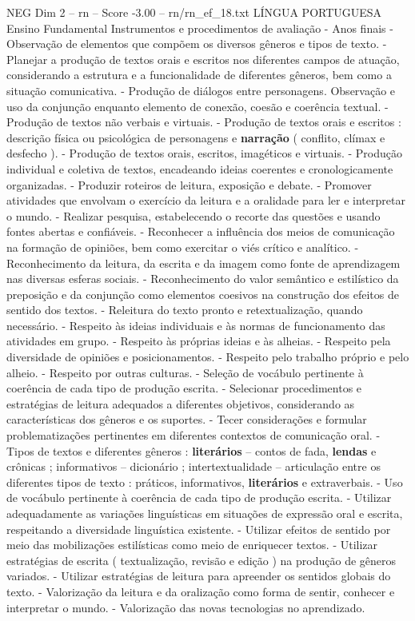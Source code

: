 \begin{textsample}{NEG Dim 2 – rn – Score -3.00 – rn/rn\_ef\_18.txt}  \label{ex:f2_neg_041}
LÍNGUA PORTUGUESA Ensino Fundamental Instrumentos e procedimentos de avaliação - Anos finais - Observação de elementos que compõem os diversos gêneros e tipos de texto. - Planejar a produção de textos orais e escritos nos diferentes campos de atuação, considerando a estrutura e a funcionalidade de diferentes gêneros, bem como a situação comunicativa. - Produção de diálogos entre personagens.
Observação e uso da conjunção enquanto elemento de conexão, coesão e coerência textual. - Produção de textos não verbais e virtuais. - Produção de textos orais e escritos : descrição física ou psicológica de personagens e \textbf{narração} ( conflito, clímax e desfecho ). - Produção de textos orais, escritos, imagéticos e virtuais. - Produção individual e coletiva de textos, encadeando ideias coerentes e cronologicamente organizadas. - Produzir roteiros de leitura, exposição e debate. - Promover atividades que envolvam o exercício da leitura e a oralidade para ler e interpretar o mundo. - Realizar pesquisa, estabelecendo o recorte das questões e usando fontes abertas e confiáveis. - Reconhecer a influência dos meios de comunicação na formação de opiniões, bem como exercitar o viés crítico e analítico. - Reconhecimento da leitura, da escrita e da imagem como fonte de aprendizagem nas diversas esferas sociais. - Reconhecimento do valor semântico e estilístico da preposição e da conjunção como elementos coesivos na construção dos efeitos de sentido dos textos. - Releitura do texto pronto e retextualização, quando necessário. - Respeito às ideias individuais e às normas de funcionamento das atividades em grupo. - Respeito às próprias ideias e às alheias. - Respeito pela diversidade de opiniões e posicionamentos. - Respeito pelo trabalho próprio e pelo alheio. - Respeito por outras culturas. - Seleção de vocábulo pertinente à coerência de cada tipo de produção escrita. - Selecionar procedimentos e estratégias de leitura adequados a diferentes objetivos, considerando as características dos gêneros e os suportes. - Tecer considerações e formular problematizações pertinentes em diferentes contextos de comunicação oral. - Tipos de textos e diferentes gêneros : \textbf{literários} – contos de fada, \textbf{lendas} e crônicas ; informativos – dicionário ; intertextualidade – articulação entre os diferentes tipos de texto : práticos, informativos, \textbf{literários} e extraverbais. - Uso de vocábulo pertinente à coerência de cada tipo de produção escrita. - Utilizar adequadamente as variações linguísticas em situações de expressão oral e escrita, respeitando a diversidade linguística existente. - Utilizar efeitos de sentido por meio das mobilizações estilísticas como meio de enriquecer textos. - Utilizar estratégias de escrita ( textualização, revisão e edição ) na produção de gêneros variados. - Utilizar estratégias de leitura para apreender os sentidos globais do texto. - Valorização da leitura e da oralização como forma de sentir, conhecer e interpretar o mundo. - Valorização das novas tecnologias no aprendizado.

\end{textsample}
